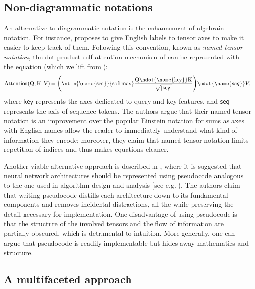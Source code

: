 \documentclass[11pt,a4paper,openright,twoside]{report}
\theoremstyle{plain}
\theoremstyle{definition}
\begin{document}
\subsection{Non-diagrammatic notations}

An alternative to diagrammatic notation is the enhancement of algebraic notation. For instance, \cite{chiang2021named} proposes to give English labels to tensor axes to make it easier to keep track of them. Following this convention, known as \textit{named tensor notation}, the dot-product self-attention mechanism of \cite{vaswani2017attention} can be represented with the equation (which we lift from \cite{chiang2021named}):
\begin{equation}
  \label{eq: attention}
  \mathrm{Attention(Q,K,V) = \left(\nbin{\name{seq}}{\mathrm{softmax}}\frac{Q \ndot{\name{key}} K}{\sqrt{|\mathsf{key}|}}\right)} \ndot{\name{seq}} V,
\end{equation}
where $\mathsf{key}$ represents the axes dedicated to query and key features, and $\mathsf{seq}$ represents the axis of sequence tokens. The authors argue that their named tensor notation is an improvement over the popular Einstein notation for sums as axes with English names allow the reader to immediately understand what kind of information they encode; moreover, they claim that named tensor notation limits repetition of indices and thus makes equations cleaner.

Another viable alternative approach is described in \cite{phuong2022formal}, where it is suggested that neural network architectures should be represented using pseudocode analogous to the one used in algorithm design and analysis (see e.g. \cite{cormen2022introduction}). The authors claim that writing pseudocode distills each architecture down to its fundamental components and removes incidental distractions, all the while preserving the detail necessary for implementation. One disadvantage of using pseudocode is that the structure of the involved tensors and the flow of information are partially obscured, which is detrimental to intuition. More generally, one can argue that pseudocode is readily implementable but hides away mathematics and structure.


\subsection{A multifaceted approach}
\end{document}
